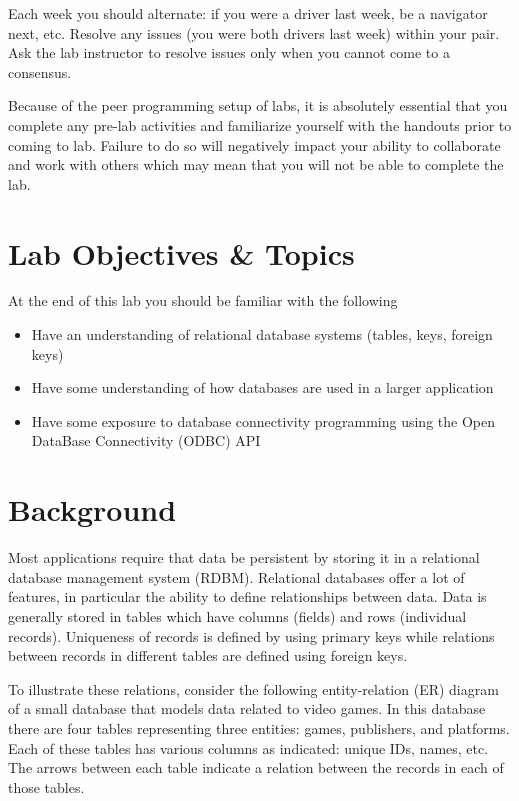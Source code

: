 \documentclass[12pt]{scrartcl}
\begin{document}
Each week you should alternate: if you were a driver last week, 
be a navigator next, etc.  Resolve any issues (you were both drivers
last week) within your pair.  Ask the lab instructor to resolve issues
only when you cannot come to a consensus.  

Because of the peer programming setup of labs, it is absolutely 
essential that you complete any pre-lab activities and familiarize
yourself with the handouts prior to coming to lab.  Failure to do
so will negatively impact your ability to collaborate and work with 
others which may mean that you will not be able to complete the
lab.  

\section{Lab Objectives \& Topics}
At the end of this lab you should be familiar with the following
\begin{itemize}
  \item Have an understanding of relational database systems (tables, 
  	keys, foreign keys) 
  \item Have some understanding of how databases are used in a 
	larger application
  \item Have some exposure to database connectivity programming 
	using the Open DataBase Connectivity (ODBC) API
\end{itemize}

\section{Background}

Most applications require that data be persistent by storing it in 
a relational database management system (RDBM).  Relational 
databases offer a lot of features, in particular the ability to define 
relationships between data.  Data is generally stored in tables 
which have columns (fields) and rows (individual records).  
Uniqueness of records is defined by using primary keys while 
relations between records in different tables are defined using 
foreign keys.

To illustrate these relations, consider the following entity-relation 
(ER) diagram of a small database that models data related to 
video games.  In this database there are four tables representing 
three entities: games, publishers, and platforms.  Each of these 
tables has various columns as indicated: unique IDs, names, etc.  
The arrows between each table indicate a relation between the 
records in each of those tables.
\end{document}
